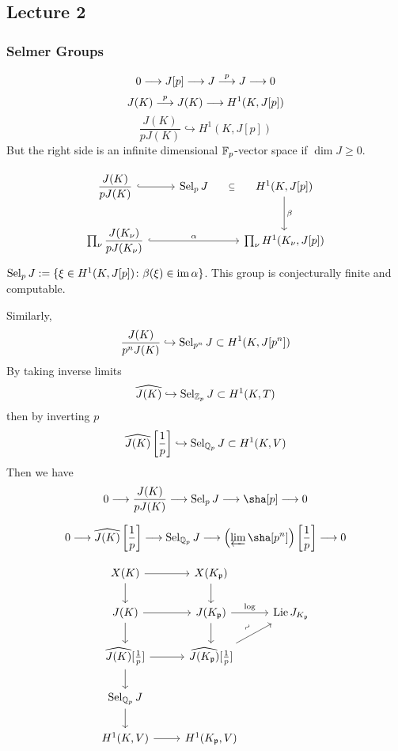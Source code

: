 \newpage
\subsection{Lecture 2}
\subsubsection{Selmer Groups}

	\[
	0 \stackrel{}{\longrightarrow} J[p] \stackrel{}{\longrightarrow} J \stackrel{p}{\longrightarrow} J \stackrel{}{\longrightarrow} 0
	\]
	\[
	J(K) \stackrel{p}{\longrightarrow} J(K) \stackrel{}{\longrightarrow} H^1(K, J[p])
	\]
	\[
	\dfrac{J(K)}{pJ(K)} \hookrightarrow H^1(K,J[p])
	\]
But the right side is an infinite dimensional $\mathbb{F}_p$-vector space if $\dim J \geq 0$. 

	\[
	\begin{tikzcd}
	\dfrac{J(K)}{pJ(K)} \arrow[hook]{r} & \sel_p J \arrow[draw=none]{r}[sloped,auto=false]{\subseteq} & H^1(K,J[p]) \arrow{d}{\beta} \\
	\prod_\nu \dfrac{J(K_\nu)}{pJ(K_\nu)} \arrow[hook]{rr}{\alpha} & & \prod_\nu H^1(K_\nu,J[p])
	\end{tikzcd}
	\]
$\operatorname{Sel}_p J:= \{ \xi \in H^1(K,J[p]) \colon \beta(\xi) \in \operatorname{im} \alpha \}$. This group is conjecturally finite and computable. 


Similarly,
	\[
	\dfrac{J(K)}{p^nJ(K)} \hookrightarrow \operatorname{Sel}_{p^n} J \subset H^1(K,J[p^n])
	\]
By taking inverse limits
	\[
	\widehat{J(K)} \hookrightarrow \operatorname{Sel}_{\mathbb{Z}_p} J \subset H^1(K,T)
	\]
then by inverting $p$
	\[
	\widehat{J(K)}\left[\frac{1}{p}\right] \hookrightarrow \operatorname{Sel}_{\mathbb{Q}_p} J \subset H^1(K,V)
	\]
Then we have
	\[
	0 \ma{} \dfrac{J(K)}{pJ(K)} \ma{} \sel_p J \ma{} \sha[p] \ma{} 0
	\]
	
	\[
	0 \ma{} \hat{J(K)}\left[\frac{1}{p}\right] \ma{} \sel_{\Qp} J \ma{} \left( \plim \sha[p^n] \right)\left[\frac{1}{p}\right] \ma{} 0
	\] 


	\[
	\begin{tikzcd}
	X(K) \arrow{d} \arrow{r} & X(K_\p) \arrow{d} \\
	J(K) \arrow{r} \arrow{d} & J(K_\p) \arrow{r}{\log} \arrow{d} & \lie J_{K_\p} \\
	\widehat{J(K)}[\frac{1}{p}] \arrow{r} \arrow{d} & \widehat{J(K_\p)}[\frac{1}{p}] \arrow{ur}{\rotatebox{45}{$\sim$}} \\
	\sel_{\Q_p} J \arrow{d} \\
	H^1(K,V) \arrow{r} & H^1(K_\p,V)
	\end{tikzcd}
	\]



